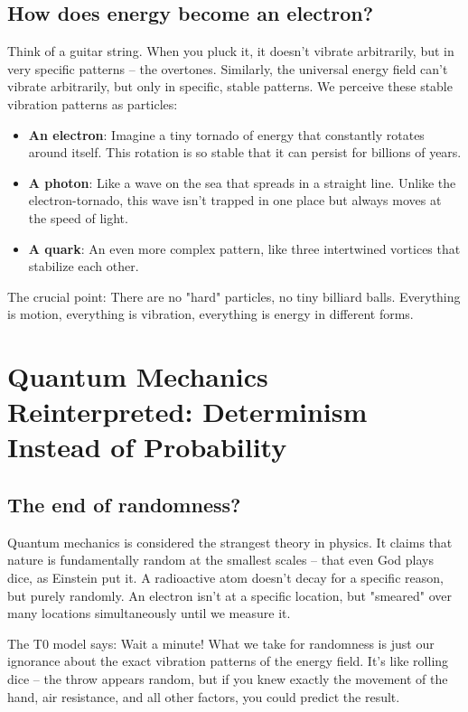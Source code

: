 \documentclass[12pt,a4paper]{article}
\begin{document}
	\subsection{How does energy become an electron?}
	
	Think of a guitar string. When you pluck it, it doesn't vibrate arbitrarily, but in very specific patterns -- the overtones. Similarly, the universal energy field can't vibrate arbitrarily, but only in specific, stable patterns. We perceive these stable vibration patterns as particles:
	
	\begin{itemize}
		\item \textbf{An electron}: Imagine a tiny tornado of energy that constantly rotates around itself. This rotation is so stable that it can persist for billions of years.
		
		\item \textbf{A photon}: Like a wave on the sea that spreads in a straight line. Unlike the electron-tornado, this wave isn't trapped in one place but always moves at the speed of light.
		
		\item \textbf{A quark}: An even more complex pattern, like three intertwined vortices that stabilize each other.
	\end{itemize}
	
	The crucial point: There are no "hard" particles, no tiny billiard balls. Everything is motion, everything is vibration, everything is energy in different forms.
	
	\section{Quantum Mechanics Reinterpreted: Determinism Instead of Probability}
	
	\subsection{The end of randomness?}
	
	Quantum mechanics is considered the strangest theory in physics. It claims that nature is fundamentally random at the smallest scales -- that even God plays dice, as Einstein put it. A radioactive atom doesn't decay for a specific reason, but purely randomly. An electron isn't at a specific location, but "smeared" over many locations simultaneously until we measure it.
	
	The T0 model says: Wait a minute! What we take for randomness is just our ignorance about the exact vibration patterns of the energy field. It's like rolling dice -- the throw appears random, but if you knew exactly the movement of the hand, air resistance, and all other factors, you could predict the result.
	
\end{document}

